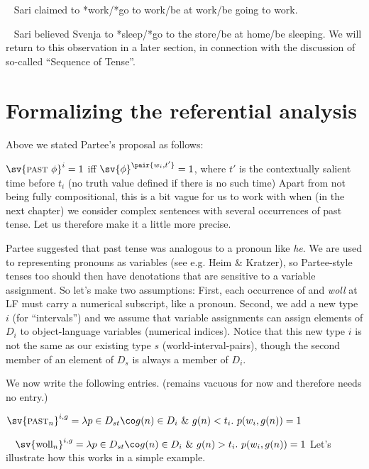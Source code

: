 \ex~ Sari claimed to *work/*go to work/be at work/be going to work.\xe

\ex~ Sari believed Svenja to *sleep/*go to the store/be at home/be sleeping.
\label{ex:believe}\xe
%
We will return to this observation in a later section, in connection with the
discussion of so-called ``Sequence of Tense''.

\section{Formalizing the referential analysis}
\label{sec:formalizing-referential}

Above we stated Partee's proposal as follows:

\ex[exno=\ref{ex:past-syn}]%
$\sv{\past\ \phi}^{i} = 1$ iff $\sv{\phi}^{\pair{w_{i},t'}} = 1$, where $t'$
is the contextually salient\\ \hfill time before $t_{i}$ (no truth value defined
if there is no such time)
\xe
%
Apart from not being fully compositional, this is a bit vague for us to work
with when (in the next chapter) we consider complex sentences with several
occurrences of past tense. Let us therefore make it a little more precise.

Partee suggested that past tense was analogous to a pronoun like \emph{he}. We
are used to representing pronouns as variables (see e.g. Heim \& Kratzer), so
Partee-style tenses too should then have denotations that are sensitive to a
variable assignment. So let's make two assumptions: First, each occurrence of
\past and \emph{woll} at LF must carry a numerical subscript, like a pronoun.
Second, we add a new type $i$ (for ``intervals'') and we assume that variable
assignments can assign elements of $D_{i}$ to object-language variables
(numerical indices). Notice that this new type $i$ is not the same as our
existing type $s$ (world-interval-pairs), though the second member of an element
of $D_{s}$ is always a member of $D_{i}$.

We now write the following entries. (\pres remains vacuous for now and therefore
needs no entry.)

\ex $\sv{\past_{n}}^{i,g} = \lambda p\in D_{st}\co g(n) \in D_{i}\
\&\ g(n) < t_{i}.\ p(w_{i},g(n)) = 1$\label{ex:formal-past}\xe

\ex~ $\sv{\text{woll}_{n}}^{i,g} = \lambda p\in D_{st}\co g(n) \in D_{i}\
\&\ g(n) > t_{i}.\ p(w_{i},g(n)) = 1$\label{ex:formal-woll}\xe
%
Let's illustrate how this works in a simple example.

